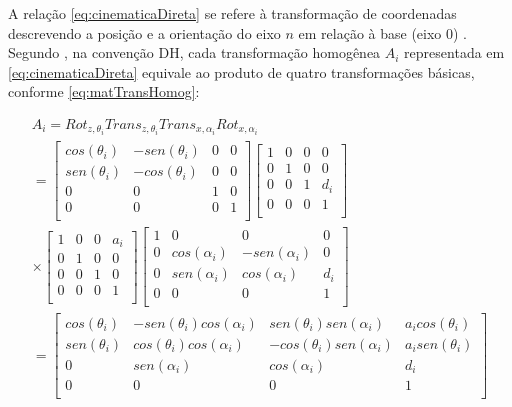 A relação \eqref{eq:cinematicaDireta} se refere à transformação de coordenadas descrevendo 
a posição e a orientação do eixo $n$ em relação à base (eixo $0$) \cite{siciliano}. Segundo
, na convenção DH, cada transformação homogênea $A_i$ representada em
\eqref{eq:cinematicaDireta} equivale ao produto de quatro transformações básicas, conforme 
\eqref{eq:matTransHomog}:

\begin{equation}
  \begin{gathered}
    A_i = Rot_{z,\theta_i}Trans_{z,\theta_i}Trans_{x,\alpha_i}Rot_{x,\alpha_i} \\[0.5cm]
    =\begin{bmatrix}
     cos(\theta_i) & -sen(\theta_i) & 0 & 0 \\
     sen(\theta_i) & -cos(\theta_i) & 0 & 0 \\
     0 & 0 & 1 & 0 \\
     0 & 0 & 0 & 1 \\
    \end{bmatrix}
    \begin{bmatrix}
     1 & 0 & 0 & 0 \\
     0 & 1 & 0 & 0 \\
     0 & 0 & 1 & d_i \\
     0 & 0 & 0 & 1 \\
    \end{bmatrix} \\
    \times \begin{bmatrix}
     1 & 0 & 0 & a_i \\
     0 & 1 & 0 & 0 \\
     0 & 0 & 1 & 0 \\
     0 & 0 & 0 & 1 \\
    \end{bmatrix}
    \begin{bmatrix}
     1 & 0 & 0 & 0 \\
     0 & cos(\alpha_i) & -sen(\alpha_i) & 0 \\
     0 & sen(\alpha_i) & cos(\alpha_i) & d_i \\
     0 & 0 & 0 & 1 \\
    \end{bmatrix} \\[0.5cm]
    =
    \begin{bmatrix}
     cos(\theta_i) & -sen(\theta_i)cos(\alpha_i) & sen(\theta_i)sen(\alpha_i) & a_icos(\theta_i) \\
     sen(\theta_i) & cos(\theta_i)cos(\alpha_i) & -cos(\theta_i)sen(\alpha_i) & a_isen(\theta_i) \\
     0 & sen(\alpha_i) & cos(\alpha_i) & d_i \\
     0 & 0 & 0 & 1 \\
    \end{bmatrix}
  \end{gathered}
  \label{eq:matTransHomog}
\end{equation}

